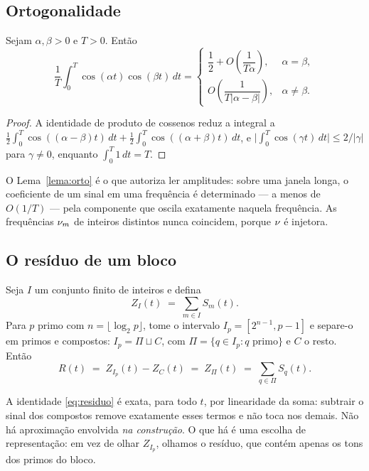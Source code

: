 \subsection{Ortogonalidade}

\begin{lema}[ortogonalidade]\label{lema:orto}
Sejam $\alpha,\beta>0$ e $T>0$. Então
\[
  \frac1T\int_0^T\cos(\alpha t)\cos(\beta t)\,dt
  =
  \begin{cases}
    \dfrac12+O\!\left(\dfrac{1}{T\alpha}\right), & \alpha=\beta,\\[10pt]
    O\!\left(\dfrac{1}{T|\alpha-\beta|}\right), & \alpha\neq\beta .
  \end{cases}
\]
\end{lema}

\begin{proof}
A identidade de produto de cossenos reduz a integral a
$\tfrac12\int_0^T\cos((\alpha-\beta)t)\,dt+\tfrac12\int_0^T\cos((\alpha+\beta)t)\,dt$,
e $\bigl|\int_0^T\cos(\gamma t)\,dt\bigr|\le 2/|\gamma|$ para $\gamma\neq0$,
enquanto $\int_0^T1\,dt=T$.
\end{proof}

O Lema~\ref{lema:orto} é o que autoriza ler amplitudes: sobre uma janela longa, o
coeficiente de um sinal em uma frequência é determinado — a menos de $O(1/T)$ —
pela componente que oscila exatamente naquela frequência. As frequências
$\nu_{m}$ de inteiros distintos nunca coincidem, porque $\nu_{}$ é injetora.

\subsection{O resíduo de um bloco}

Seja $I$ um conjunto finito de inteiros e defina
\[
  Z_I(t) \;=\; \sum_{m\in I} S_m(t).
\]
Para $p$ primo com $n=\lfloor\log_2 p\rfloor$, tome o intervalo
$I_p=[2^{n-1},p-1]$ e separe-o em primos e compostos:
$I_p = \Pi \sqcup C$, com $\Pi=\{q\in I_p: q \text{ primo}\}$ e $C$ o resto. Então
\begin{equation}\label{eq:residuo}
  R(t) \;=\; Z_{I_p}(t)-Z_C(t) \;=\; Z_{\Pi}(t) \;=\; \sum_{q\in\Pi} S_q(t).
\end{equation}

A identidade \eqref{eq:residuo} é exata, para todo $t$, por linearidade da soma:
subtrair o sinal dos compostos remove exatamente esses termos e não toca nos
demais. Não há aproximação envolvida \emph{na construção}. O que há é uma escolha
de representação: em vez de olhar $Z_{I_p}$, olhamos o resíduo, que contém apenas
os tons dos primos do bloco.

